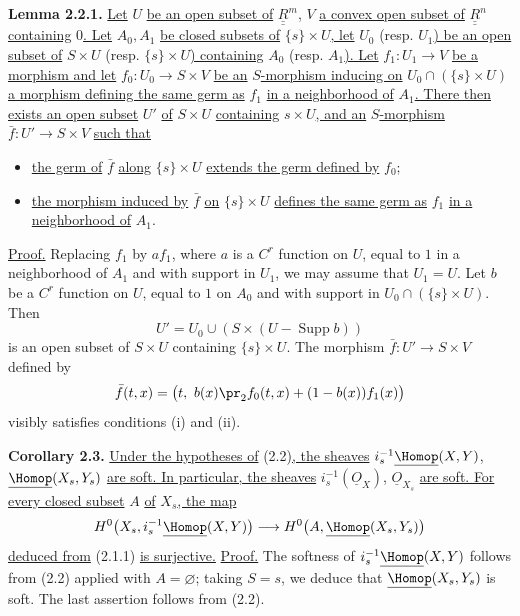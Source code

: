 \textbf{Lemma 2.2.1.} \uline{Let} $U$ \uline{be an open subset of} $\underline{\underline{R}}^m$, $V$ \uline{a convex open subset of} $\underline{\underline{R}}^n$ \uline{containing} $0$\uline{. Let} $A_0,A_1$ \uline{be closed subsets of} $\{s\}\times U$\uline{, let} $U_0$ (resp. $U_1$\uline{) be an open subset of} $S\times U$ (resp. $\{s\}\times U$\uline{) containing} $A_0$ (resp. $A_1$\uline{). Let} $f_1:U_1\to V$ \uline{be a morphism and let} $f_0:U_0\to S\times V$ \uline{be an} $S$\uline{-morphism inducing on} $U_0\cap(\{s\}\times U)$ \uline{a morphism defining the same germ as} $f_1$ \uline{in a neighborhood of} $A_1$\uline{. There then exists an open subset} $U'$ \uline{of} $S\times U$ \uline{containing} $s\times U$\uline{, and an} $S$\uline{-morphism} $\bar f:U'\longrightarrow S\times V$ \uline{such that}
\begin{itemize}
\item[(i)] \uline{the germ of} $\bar f$ \uline{along} $\{s\}\times U$ \uline{extends the germ defined by} $f_0$;
\item[(ii)] \uline{the morphism induced by} $\bar f$ \uline{on} $\{s\}\times U$ \uline{defines the same germ as} $f_1$ \uline{in a neighborhood of} $A_1$.
\end{itemize}

\uline{Proof.} Replacing $f_1$ by $af_1$, where $a$ is a $C^r$ function on $U$, equal to $1$ in a neighborhood of $A_1$ and with support in $U_1$, we may assume that $U_1=U$. Let $b$ be a $C^r$ function on $U$, equal to $1$ on $A_0$ and with support in $U_0\cap(\{s\}\times U)$. Then
\[
  U'=U_0\cup(S\times(U-\operatorname{Supp}b))
\]
is an open subset of $S\times U$ containing $\{s\}\times U$. The morphism $\bar f:U'\to S\times V$ defined by
\[
  \bar f(t,x)=\bigl(t,\ b(x)\pr_2f_0(t,x)+(1-b(x))f_1(x)\bigr)
\]
visibly satisfies conditions (i) and (ii).

\textbf{Corollary 2.3.} \uline{Under the hypotheses of} (2.2)\uline{, the sheaves} $i_s^{-1}\underline{\Homop}(X,Y)$, $\underline{\Homop}(X_s,Y_s)$ \uline{are soft. In particular, the sheaves} $i_s^{-1}(\underline{O}_X)$, $\underline{O}_{X_s}$ \uline{are soft}\uline{. For every closed subset} $A$ \uline{of} $X_s$\uline{, the map}
\[
  H^0\bigl(X_s,i_s^{-1}\underline{\Homop}(X,Y)\bigr)
  \longrightarrow
  H^0\bigl(A,\underline{\Homop}(X_s,Y_s)\bigr)
\]
\uline{deduced from} (2.1.1) \uline{is surjective.}
%
\uline{Proof.} The softness of $i_s^{-1}\underline{\Homop}(X,Y)$ follows from (2.2) applied with $A=\varnothing$; taking $S=s$, we deduce that $\underline{\Homop}(X_s,Y_s)$ is soft. The last assertion follows from (2.2).

